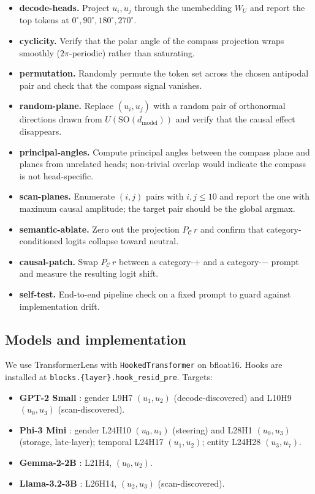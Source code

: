 \begin{itemize}
    \item \textbf{decode-heads.} Project $u_i, u_j$ through the unembedding
    $W_U$ and report the top tokens at $0^\circ, 90^\circ, 180^\circ, 270^\circ$.
    \item \textbf{cyclicity.} Verify that the polar angle of the compass
    projection wraps smoothly ($2\pi$-periodic) rather than saturating.
    \item \textbf{permutation.} Randomly permute the token set across the
    chosen antipodal pair and check that the compass signal vanishes.
    \item \textbf{random-plane.} Replace $(u_i, u_j)$ with a random pair
    of orthonormal directions drawn from $U(\mathrm{SO}(d_\text{model}))$
    and verify that the causal effect disappears.
    \item \textbf{principal-angles.} Compute principal angles between the
    compass plane and planes from unrelated heads; non-trivial overlap
    would indicate the compass is not head-specific.
    \item \textbf{scan-planes.} Enumerate $(i,j)$ pairs with $i,j \leq 10$
    and report the one with maximum causal amplitude; the target pair
    should be the global argmax.
    \item \textbf{semantic-ablate.} Zero out the projection
    $P_{\mathcal{C}}\,r$ and confirm that category-conditioned logits
    collapse toward neutral.
    \item \textbf{causal-patch.} Swap $P_{\mathcal{C}}\,r$ between a
    category-$+$ and a category-$-$ prompt and measure the resulting logit
    shift.
    \item \textbf{self-test.} End-to-end pipeline check on a fixed prompt
    to guard against implementation drift.
\end{itemize}

\subsection{Models and implementation}

We use TransformerLens \citep{nanda2022transformerlens} with
\texttt{HookedTransformer} on bfloat16. Hooks are installed at
\texttt{blocks.\{layer\}.hook\_resid\_pre}. Targets:

\begin{itemize}
    \item \textbf{GPT-2 Small} \citep{radford2019language}: gender L9H7
    $(u_1, u_2)$ (decode-discovered) and L10H9 $(u_0, u_3)$
    (scan-discovered).
    \item \textbf{Phi-3 Mini} \citep{abdin2024phi3}: gender L24H10
    $(u_0, u_1)$ (steering) and L28H1 $(u_0, u_3)$ (storage, late-layer);
    temporal L24H17 $(u_1, u_2)$; entity L24H28 $(u_3, u_7)$.
    \item \textbf{Gemma-2-2B} \citep{team2024gemma}: L21H4, $(u_0, u_2)$.
    \item \textbf{Llama-3.2-3B} \citep{grattafiori2024llama3}: L26H14,
    $(u_2, u_3)$ (scan-discovered).
\end{itemize}

